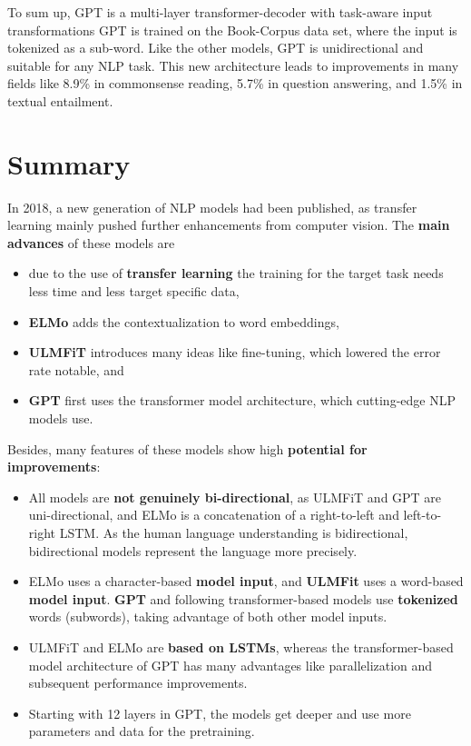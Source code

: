 \documentclass[]{krantz}
\providecommand{\tightlist}{%
  \setlength{\itemsep}{0pt}\setlength{\parskip}{0pt}}
\begin{document}
To sum up, GPT is a multi-layer transformer-decoder with task-aware input transformations
GPT is trained on the Book-Corpus data set, where the input is tokenized as a sub-word.
Like the other models, GPT is unidirectional and suitable for any NLP task.
This new architecture leads to improvements in many fields like 8.9\% in commonsense reading, 5.7\% in question answering, and 1.5\% in textual entailment.

\hypertarget{summary}{%
\section{Summary}\label{summary}}

In 2018, a new generation of NLP models had been published, as transfer learning mainly pushed further enhancements from computer vision.
The \textbf{main advances} of these models are

\begin{itemize}
\tightlist
\item
  due to the use of \textbf{transfer learning} the training for the target task needs less time and less target specific data,
\item
  \textbf{ELMo} adds the contextualization to word embeddings,
\item
  \textbf{ULMFiT} introduces many ideas like fine-tuning, which lowered the error rate notable, and
\item
  \textbf{GPT} first uses the transformer model architecture, which cutting-edge NLP models use.
\end{itemize}

Besides, many features of these models show high \textbf{potential for improvements}:

\begin{itemize}
\tightlist
\item
  All models are \textbf{not genuinely bi-directional}, as ULMFiT and GPT are uni-directional, and ELMo is a concatenation of a right-to-left and left-to-right LSTM. As the human language understanding is bidirectional, bidirectional models represent the language more precisely.
\item
  ELMo uses a character-based \textbf{model input}, and \textbf{ULMFit} uses a word-based \textbf{model input}. \textbf{GPT} and following transformer-based models use \textbf{tokenized} words (subwords), taking advantage of both other model inputs.
\item
  ULMFiT and ELMo are \textbf{based on LSTMs}, whereas the transformer-based model architecture of GPT has many advantages like parallelization and subsequent performance improvements.
\item
  Starting with 12 layers in GPT, the models get deeper and use more parameters and data for the pretraining.
\end{itemize}
\end{document}
